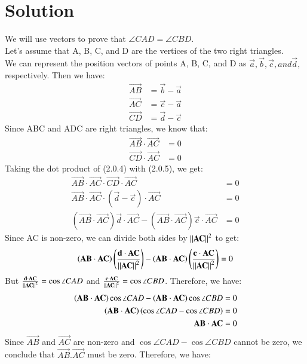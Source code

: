 \documentclass[journal,12pt,twocolumn]{IEEEtran}
\begin{document}
\section{Solution}
We will use vectors to prove that $\angle CAD = \angle CBD$. \\
Let's assume that A, B, C, and D are the vertices of the two right triangles.\\
We can represent the position vectors of points A, B, C, and D as $\vec{a}, \vec{b}, \vec{c}, and \vec{d},$ respectively. Then we have:
\begin{align}
\vec{AB} &= \vec{b} - \vec{a}\\
\vec{AC} &= \vec{c} - \vec{a}\\
\vec{CD} &= \vec{d} - \vec{c}
\end{align}
Since ABC and ADC are right triangles, we know that:
\begin{align}
\vec{AB} \cdot \vec{AC} &= 0 \\
\vec{CD} \cdot \vec{AC} &= 0 
\end{align}
Taking the dot product of (2.0.4) with (2.0.5), we get:
\begin{align}
\vec{AB} \cdot \vec{AC} \cdot \vec{CD} \cdot \vec{AC} &= 0\\
\vec{AB} \cdot \vec{AC} \cdot (\vec{d} - \vec{c}) \cdot \vec{AC} &= 0\\
(\vec{AB} \cdot \vec{AC}) \vec{d} \cdot \vec{AC} - (\vec{AB} \cdot \vec{AC})\vec{c} \cdot \vec{AC} &= 0
\end{align}
Since AC is non-zero, we can divide both sides by $\left\lVert\mathbf{AC}\right\rVert^2$ to get:
\begin{align}
\left(\mathbf{AB} \cdot \mathbf{AC}\right) \left( \frac{\mathbf{d} \cdot \mathbf{AC}} {\left\lVert\mathbf{AC}\right\rVert^2 } \right)- \left(\mathbf{AB} \cdot \mathbf{AC} \right)\left(\frac{\mathbf{c} \cdot \mathbf{AC}} {\left\lVert\mathbf{AC}\right\rVert^2 } \right) = 0
\end{align}
But $\frac { \mathbf{d} \cdot \mathbf{AC}} {\left\lVert\mathbf{AC}\right\rVert^2} = \cos \angle CAD $ and $\frac{\mathbf{c} \cdot \mathbf{AC}} {\left\lVert\mathbf{AC}\right\rVert^2}= \cos \angle CBD$. Therefore, we have:
\begin{align}
\left(\mathbf{AB} \cdot \mathbf{AC}\right)\cos\angle CAD - \left(\mathbf{AB} \cdot \mathbf{AC}\right)\cos\angle CBD &= 0\\
\left(\mathbf{AB} \cdot \mathbf{AC}\right) \left(\cos\angle CAD - \cos\angle CBD\right) &= 0\\
\mathbf{AB} \cdot \mathbf{AC} &= 0
\end{align}
Since $\vec{AB}$ and $\vec{AC}$ are non-zero and $\cos\angle CAD - \cos \angle CBD$ cannot be zero, we conclude that $\vec{AB} . \vec{AC}$ must be zero. Therefore, we have:
\end{document}
